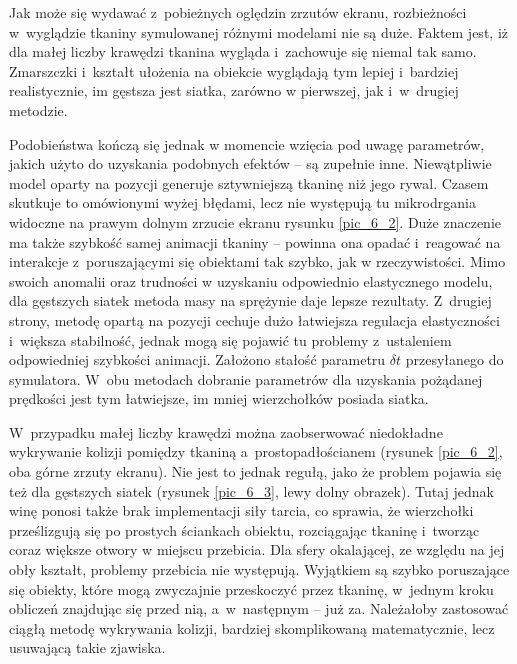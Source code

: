 		
		Jak może się wydawać z~pobieżnych oględzin zrzutów ekranu, rozbieżności w~wyglądzie tkaniny symulowanej różnymi modelami nie są duże. Faktem jest, iż dla małej liczby krawędzi tkanina wygląda i~zachowuje się niemal tak samo. Zmarszczki i~kształt ułożenia na obiekcie wyglądają tym lepiej i~bardziej realistycznie, im gęstsza jest siatka, zarówno w pierwszej, jak i~w~drugiej metodzie. 
		
		Podobieństwa kończą się jednak w momencie wzięcia pod uwagę parametrów, jakich użyto do uzyskania podobnych efektów -- są zupełnie inne. Niewątpliwie model oparty na pozycji generuje sztywniejszą tkaninę niż jego rywal. Czasem skutkuje to omówionymi wyżej błędami, lecz nie występują tu mikrodrgania widoczne na prawym dolnym zrzucie ekranu rysunku \ref{pic_6_2}. Duże znaczenie ma także szybkość samej animacji tkaniny -- powinna ona opadać i~reagować na interakcje z~poruszającymi się obiektami tak szybko, jak w rzeczywistości. Mimo swoich anomalii oraz trudności w uzyskaniu odpowiednio elastycznego modelu, dla gęstszych siatek metoda masy na sprężynie daje lepsze rezultaty. Z~drugiej strony, metodę opartą na pozycji cechuje dużo łatwiejsza regulacja elastyczności i~większa stabilność, jednak mogą się pojawić tu problemy z~ustaleniem odpowiedniej szybkości animacji. Założono stałość parametru \(\delta t \) przesyłanego do symulatora. W~obu metodach dobranie parametrów dla uzyskania pożądanej prędkości jest tym łatwiejsze, im mniej wierzchołków posiada siatka.
		
		W~przypadku małej liczby krawędzi można zaobserwować niedokładne wykrywanie kolizji pomiędzy tkaniną a~prostopadłościanem (rysunek \ref{pic_6_2}, oba górne zrzuty ekranu). Nie jest to jednak regułą, jako że problem pojawia się też dla gęstszych siatek (rysunek \ref{pic_6_3}, lewy dolny obrazek). Tutaj jednak winę ponosi także brak implementacji siły tarcia, co sprawia, że wierzchołki prześlizgują się po prostych ściankach obiektu, rozciągając tkaninę i~tworząc coraz większe otwory w miejscu przebicia. Dla sfery okalającej, ze względu na jej obły kształt, problemy przebicia nie występują. Wyjątkiem są szybko poruszające się obiekty, które mogą zwyczajnie przeskoczyć przez tkaninę, w~jednym kroku obliczeń znajdując się przed nią, a~w~następnym -- już za. Należałoby zastosować ciągłą metodę wykrywania kolizji, bardziej skomplikowaną matematycznie, lecz usuwającą takie zjawiska.
		
